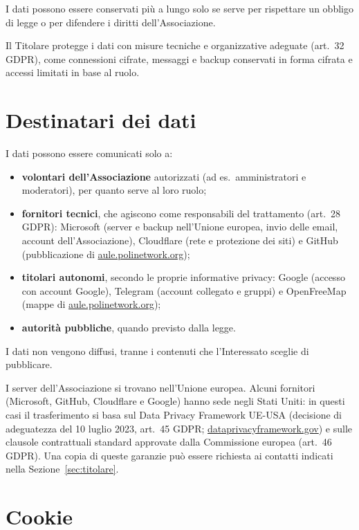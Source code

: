 \documentclass[legal]{polinetwork}
\begin{document}
I dati possono essere conservati più a lungo solo se serve per rispettare un obbligo di legge o per difendere i diritti dell'Associazione.

Il Titolare protegge i dati con misure tecniche e organizzative adeguate (art.~32 GDPR), come connessioni cifrate, messaggi e backup conservati in forma cifrata e accessi limitati in base al ruolo.

\section{Destinatari dei dati}
\label{sec:destinatari}

I dati possono essere comunicati solo a:
\begin{itemize}
    \item \textbf{volontari dell'Associazione} autorizzati (ad es.~amministratori e moderatori), per quanto serve al loro ruolo;
    \item \textbf{fornitori tecnici}, che agiscono come responsabili del trattamento (art.~28 GDPR): Microsoft (server e backup nell'Unione europea, invio delle email, account dell'Associazione), Cloudflare (rete e protezione dei siti) e GitHub (pubblicazione di \href{https://aule.polinetwork.org}{aule.polinetwork.org});
    \item \textbf{titolari autonomi}, secondo le proprie informative privacy: Google (accesso con account Google), Telegram (account collegato e gruppi) e OpenFreeMap (mappe di \href{https://aule.polinetwork.org}{aule.polinetwork.org});
    \item \textbf{autorità pubbliche}, quando previsto dalla legge.
\end{itemize}

I dati non vengono diffusi, tranne i contenuti che l'Interessato sceglie di pubblicare.

I server dell'Associazione si trovano nell'Unione europea. Alcuni fornitori (Microsoft, GitHub, Cloudflare e Google) hanno sede negli Stati Uniti: in questi casi il trasferimento si basa sul Data Privacy Framework UE-USA (decisione di adeguatezza del 10 luglio 2023, art.~45 GDPR; \href{https://www.dataprivacyframework.gov}{dataprivacyframework.gov}) e sulle clausole contrattuali standard approvate dalla Commissione europea (art.~46 GDPR). Una copia di queste garanzie può essere richiesta ai contatti indicati nella Sezione~\ref{sec:titolare}.

\section{Cookie}
\label{sec:cookie}
\end{document}
